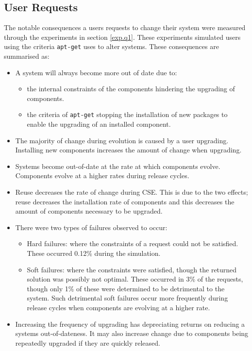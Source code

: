 \subsection{User Requests}
The notable consequences a users requests to change their system were measured through the experiments in section \ref{exp.q1}.
These experiments simulated users using the criteria \texttt{apt-get} uses to alter systems.
These consequences are summarised as:
\begin{itemize}
	\item A system will always become more out of date due to:
  		\begin{itemize}
  			\item the internal constraints of the components hindering the upgrading of components.
  			\item the criteria of \texttt{apt-get} stopping the installation of new packages to enable the upgrading of an installed component.  
		\end{itemize}
	\item The majority of change during evolution is caused by a user upgrading.
	Installing new components increases the amount of change when upgrading.
	\item Systems become out-of-date at the rate at which components evolve. Components evolve at a higher rates during release cycles.
	\item Reuse decreases the rate of change during CSE.
	This is due to the two effects; 
	reuse decreases the installation rate of components and this decreases the amount of components necessary to be upgraded.   
	\item There were two types of failures observed to occur:
		\begin{itemize}
  			\item Hard failures: where the constraints of a request could not be satisfied. These occurred 0.12\% during the simulation.
  			\item Soft failures: where the constraints were satisfied, though the returned solution was possibly not optimal.
  				These occurred in 3\% of the requests, though only 1\% of these were determined to be detrimental to the system.
  				Such detrimental soft failures occur more frequently during release cycles when components are evolving at a higher rate.
		\end{itemize}
	\item Increasing the frequency of upgrading has depreciating returns on reducing a systems out-of-dateness. 
	It may also increase change due to components being repeatedly upgraded if they are quickly released. 
\end{itemize}

